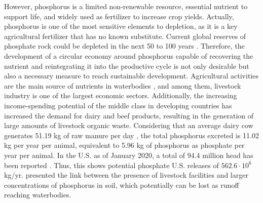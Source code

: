 \documentclass[10pt,a4paper]{article}
\begin{document}
However, phosphorus is a limited non-renewable resource, essential nutrient to support life, and widely used as fertilizer to increase crop yields. Actually, phosphorus is one of the most sensitive elements to depletion, as it is a key agricultural fertilizer that has no known substitute. Current global reserves of phosphate rock could be depleted in the next 50 to 100 years . Therefore, the development of a circular economy around phosphorus capable of recovering the nutrient and reintegrating it into the productive cycle is not only desirable but also a necessary measure to reach sustainable development. Agricultural activities are the main source of nutrients in waterbodies , and among them, livestock industry is one of the largest economic sectors. Additionally, the increasing income-spending potential of the middle class in developing countries has increased the demand for dairy and beef products, resulting in the generation of large amounts of livestock organic waste. Considering that an average dairy cow generates 51.19 kg of raw manure per day , the total phosphorus excreted is 11.02 kg per year per animal, equivalent to 5.96 kg of phosphorus as phosphate per year per animal. In the U.S. as of January 2020, a total of 94.4 million head has been reported . Thus, this shows potential phosphate U.S. releases of $562.6\cdot10^{6}$ kg/yr.  presented the link between the presence of livestock facilities and larger concentrations of phosphorus in soil, which potentially can be lost as runoff reaching waterbodies. 
\end{document}
